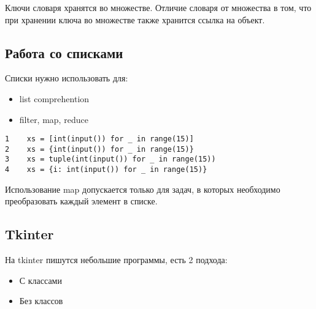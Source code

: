 \documentclass[12pt, a4paper]{article}
\begin{document}
Ключи словаря хранятся во множестве. Отличие словаря от множества в том, что при хранении ключа во множестве также хранится ссылка на объект. 

\subsection{Работа со списками}

Списки нужно использовать для:
\begin{itemize}
    \item list comprehention
    \item filter, map, reduce
\end{itemize}

\begin{verbatim}
1    xs = [int(input()) for _ in range(15)]
2    xs = {int(input()) for _ in range(15)}
3    xs = tuple(int(input()) for _ in range(15))
4    xs = {i: int(input()) for _ in range(15)}
\end{verbatim}

Использование map допускается только для задач, в которых необходимо преобразовать каждый элемент в списке.

\subsection{Tkinter}

На tkinter пишутся небольшие программы, есть 2 подхода:

\begin{itemize}
    \item С классами
    \item Без классов
\end{itemize}
\end{document}
